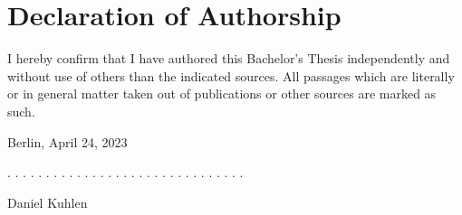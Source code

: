 \documentclass[a4paper,11pt]{article}
\newcommand{\thesistype}{Bachelor's Thesis}
\newcommand{\thesisauthor}{Daniel Kuhlen}
\newcommand{\thesisdate}{April 24, 2023}
\begin{document}
\newpage



\newpage
\thispagestyle{empty}
\hypertarget{declaration-of-authorship}{%
\section*{Declaration of Authorship}\label{declaration-of-authorship}}

I hereby confirm that I have authored this \thesistype{} independently and
without use of others than the indicated sources. All passages which are
literally or in general matter taken out of publications or other sources are
marked as such.
\vspace{1cm}

Berlin, \thesisdate{}
\vspace{3cm}

. . . . . . . . . . . . . . . . . . . . . . . . . . . . . . .
\vspace{0.1cm}

\thesisauthor{}
\end{document}
